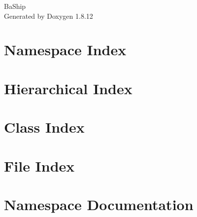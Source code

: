 \documentclass[twoside]{book}
\newcommand{\+}{\discretionary{\mbox{\scriptsize$\hookleftarrow$}}{}{}}
\newcommand{\clearemptydoublepage}{%
  \newpage{\pagestyle{empty}\cleardoublepage}%
}
\begin{document}
\hypersetup{pageanchor=false,
             bookmarksnumbered=true,
             pdfencoding=unicode
            }
\begin{titlepage}
\vspace*{7cm}
\begin{center}%
{\Large Ba\+Ship }\\
\vspace*{1cm}
{\large Generated by Doxygen 1.8.12}\\
\end{center}
\end{titlepage}
\clearemptydoublepage
{}
\tableofcontents
\clearemptydoublepage
{}
\hypersetup{pageanchor=true}

\chapter{Namespace Index}

\chapter{Hierarchical Index}

\chapter{Class Index}

\chapter{File Index}

\chapter{Namespace Documentation}

















\end{document}
